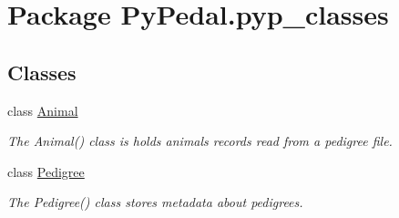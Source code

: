\hypertarget{namespacePyPedal_1_1pyp__classes}{
\section{Package Py\-Pedal.pyp\_\-classes}
\label{namespacePyPedal_1_1pyp__classes}
}


\subsection*{Classes}
\begin{CompactItemize}
\item 
class \hyperlink{classPyPedal_1_1pyp__classes_1_1Animal}{Animal}
\begin{CompactList}\small\item\em The Animal() class is holds animals records read from a pedigree file. \item\end{CompactList}\item 
class \hyperlink{classPyPedal_1_1pyp__classes_1_1Pedigree}{Pedigree}
\begin{CompactList}\small\item\em The Pedigree() class stores metadata about pedigrees. \item\end{CompactList}\end{CompactItemize}
